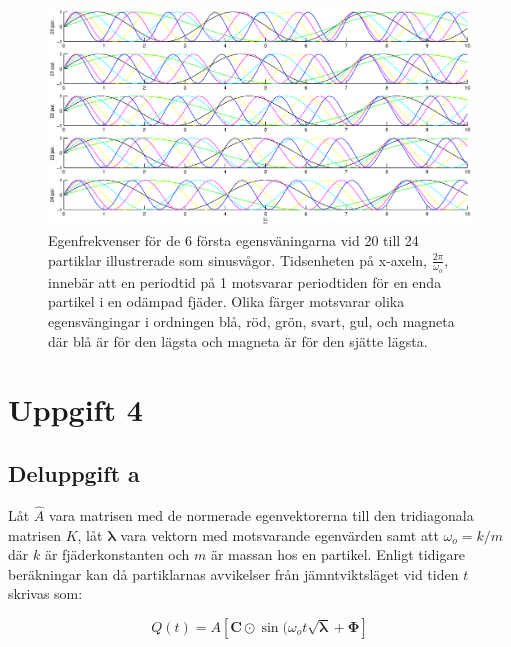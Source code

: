 \documentclass[12pt,a4paper]{article}
\begin{document}
		
		\begin{figure}
			\hspace{-1.5cm}\includegraphics[width=1.2\textwidth]{egenfrekvenser.eps}
			\caption{Egenfrekvenser för de 6 första egensväningarna vid 20 till 24 partiklar
			illustrerade som sinusvågor. Tidsenheten på x-axeln, $\frac{2\pi}{\omega_o}$,
			innebär att en periodtid på 1 motsvarar periodtiden för en enda partikel i en
			odämpad fjäder. Olika färger motsvarar olika egensvängingar i ordningen blå, röd,
			grön, svart, gul, och magneta där blå är för den lägsta och magneta är för den sjätte lägsta.}
			\label{egenf}
		\end{figure}
		
		\clearpage
		
\section{Uppgift 4}
	
	\setcounter{equation}{0}
	
	\subsection{Deluppgift a}
		
		Låt $\hat{A}$ vara matrisen med de normerade egenvektorerna till den tridiagonala
		matrisen $K$, låt $\boldsymbol{\lambda}$ vara vektorn med motsvarande egenvärden samt att
		$\omega_o = k / m$ där $k$ är fjäderkonstanten och $m$ är massan hos en partikel.
		Enligt tidigare beräkningar kan då partiklarnas avvikelser från jämntviktsläget vid
		tiden $t$ skrivas som:
		
		\begin{equation*}
			Q(t) = A \left[ \mathbf{C} \odot \sin(\omega_o t \sqrt{\boldsymbol{\lambda}} + \mathbf{\Phi} \right]
		\end{equation*}
		
\end{document}
